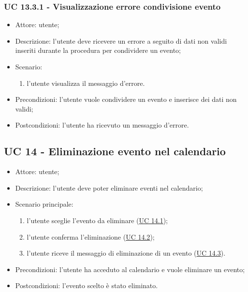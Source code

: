 \subsubsection{UC 13.3.1 - Visualizzazione errore condivisione evento} \label{sec: UC 13.3.1}
\begin{itemize}
    \item Attore: utente;
    \item Descrizione: l'utente deve ricevere un errore a seguito di dati non validi inseriti durante la procedura per condividere un evento;
    \item Scenario:
        \begin{enumerate}
        \item l'utente visualizza il messaggio d'errore.
        \end{enumerate}
    
    \item Precondizioni: l'utente vuole condividere un evento e inserisce dei dati non validi;
    \item Postcondizioni: l'utente ha ricevuto un messaggio d'errore.
\end{itemize}


\subsection{UC 14 - Eliminazione evento nel calendario}
\begin{itemize}
    \item Attore: utente;
    \item Descrizione: l'utente deve poter eliminare eventi nel calendario;
    \item Scenario principale:
        \begin{enumerate}
        \item l'utente sceglie l'evento da eliminare (\hyperref[sec: UC 14.1]{UC 14.1});
        \item l'utente conferma l'eliminazione (\hyperref[sec: UC 14.2]{UC 14.2});
        \item l'utente riceve il messaggio di eliminazione di un evento (\hyperref[sec: UC 14.3]{UC 14.3}).
        \end{enumerate}
    \item Precondizioni: l'utente ha acceduto al calendario e vuole eliminare un evento;
    \item Postcondizioni: l'evento scelto è stato eliminato.
\end{itemize}

